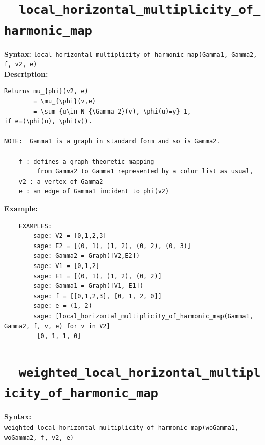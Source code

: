 \documentclass{article}
\begin{document}
\section{\tt \ \ local\_horizontal\_multiplicity\_of\_harmonic\_map}

\textbf{Syntax:} \verb}local_horizontal_multiplicity_of_harmonic_map(Gamma1, Gamma2, f, v2, e)}\\

\textbf{Description:}
\begin{verbatim}
Returns mu_{phi}(v2, e)
        = \mu_{\phi}(v,e)
        = \sum_{u\in N_{\Gamma_2}(v), \phi(u)=y} 1,
if e=(\phi(u), \phi(v)).

NOTE:  Gamma1 is a graph in standard form and so is Gamma2.

    f : defines a graph-theoretic mapping
         from Gamma2 to Gamma1 represented by a color list as usual,
    v2 : a vertex of Gamma2
    e : an edge of Gamma1 incident to phi(v2)
\end{verbatim}

\textbf{Example:}
\begin{verbatim}
    EXAMPLES:
        sage: V2 = [0,1,2,3]
        sage: E2 = [(0, 1), (1, 2), (0, 2), (0, 3)]
        sage: Gamma2 = Graph([V2,E2])
        sage: V1 = [0,1,2]
        sage: E1 = [(0, 1), (1, 2), (0, 2)]
        sage: Gamma1 = Graph([V1, E1])
        sage: f = [[0,1,2,3], [0, 1, 2, 0]]
        sage: e = (1, 2)
        sage: [local_horizontal_multiplicity_of_harmonic_map(Gamma1, Gamma2, f, v, e) for v in V2]
         [0, 1, 1, 0]
\end{verbatim}

\section{\tt \ \ weighted\_local\_horizontal\_multiplicity\_of\_harmonic\_map}

\textbf{Syntax:} \verb}weighted_local_horizontal_multiplicity_of_harmonic_map(woGamma1, woGamma2, f, v2, e)}\\
\end{document}
